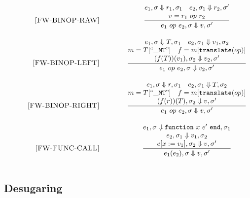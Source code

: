 \documentclass{article}
\begin{document}
\begin{figure}[P]
\[\begin{array}{r@{\qquad\qquad}c}
%  
\ssrule{FW-BINOP-RAW}{
  \semanticFull{e_1}{\sigma}{r_1}{\sigma_1} \quad
  \semanticFull{e_2}{\sigma_1}{r_2}{\sigma'} \\
  v = r_1 ~op~ r_2
}{
  \semanticFull{e_1 ~op~ e_2}{\sigma}{v}{\sigma'}
}
\ssrule{FW-BINOP-LEFT}{
  \semanticFull{e_1}{\sigma}{T}{\sigma_1} \quad
  \semanticFull{e_2}{\sigma_1}{v_1}{\sigma_2} \\
  m = T[{\tt ``{\_}MT"}]\quad
  f = m[{\tt translate}(op)]\\
   \semanticFull{(f(T))(v_1)}  {\sigma_2}    {v_2} {\sigma'} \\
}{
  \semanticFull{e_1 ~op~ e_2}{\sigma}{v_2}{\sigma'}
}
\ssrule{FW-BINOP-RIGHT}{
  \semanticFull{e_1}{\sigma}{r}{\sigma_1} \quad
  \semanticFull{e_2}{\sigma_1}{T}{\sigma_2} \\
  m = T[{\tt ``{\_}MT"}]\quad
  f = m[{\tt translate}(op)]\\
   \semanticFull{(f(r))(T)}  {\sigma_2}    {v} {\sigma'} \\
}{
  \semanticFull{e_1 ~op~ e_2}{\sigma}{v}{\sigma'}
}
\ssrule{FW-FUNC-CALL}{
  \semanticFull{e_1}{\sigma}{{\tt function} ~x ~e' ~{\tt end}}{\sigma_1} \\
  \semanticFull{e_2}{\sigma_1}{v_1}{\sigma_2} \\
  \semanticFull{e[x:=v_1]}{\sigma_2}{v}{\sigma'} 
}{
  \semanticFull{e_1(e_2)}{\sigma}{v}{\sigma'} 
}
\end{array}
\]
\end{figure}
\subsection{Desugaring}

\newcommand{\desugar}[2]{{#1} & \xlongequal[]{def} & {\begin{array}{@{}l@{}} #2 \end{array}}\\}
\end{document}
